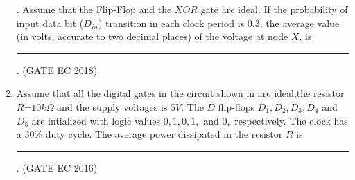 \begin{enumerate}[label=\arabic*.,ref=\theenumi]
	.
 Assume that the Flip-Flop and the $XOR$ gate are ideal.
 If the probability of input data bit ($D_{in}$) transition in each clock period is $0.3$, the average
    value (in volts, accurate to two decimal places) of the voltage at node $X$, is \rule{1cm}{0.1pt}.
%
\hfill (GATE EC 2018)
	\begin{figure}[H]
    \centering
    \resizebox{0.75\columnwidth}{!}{%
			
	}
    \caption{}
	\label{fig:GATE EC 2018,46}
\end{figure}
 \item Assume that all the digital gates in the circuit shown in 
are ideal,the resistor $R$=$10k\Omega $ and the supply voltages is $5V$. The $D$ flip-flops $D_1,D_2,D_3,D_4$ and $D_5$ are intialized with logic values $0,1,0,1,$ and $0,$ respectively. The clock has a $30\%$ duty cycle.
The average power dissipated in the resistor $R$ is \rule{1cm}{0.1pt}.
\hfill{(GATE EC 2016)}
% 
	\begin{figure}[H]
    \centering
    \resizebox{0.75\columnwidth}{!}{%
    \begin{circuitikz}[scale=0.8]


\end{circuitikz}}
\end{figure}
\end{enumerate}
